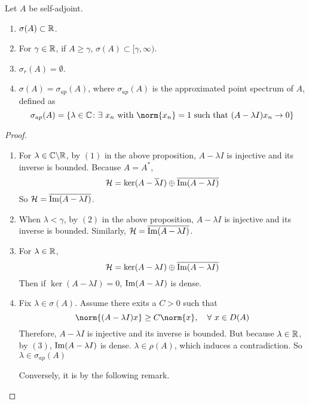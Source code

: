 \documentclass[a4paper,12pt]{article}
\begin{document}
\begin{thm}
    Let $A$ be self-adjoint.
    \begin{enumerate}[label=(\arabic{*})]
        \item $\sigma(A) \subset \mathbb{R}$.
        \item For $\gamma \in \mathbb{R}$, if $A \geq \gamma$, $\sigma(A) \subset [\gamma,\infty)$.
        \item $\sigma_r(A) = \emptyset$.
        \item $\sigma(A) = \sigma_{ap}(A)$, where $\sigma_{ap}(A)$ is the approximated point spectrum of $A$, defined as
        \begin{equation*}
            \sigma_{ap}(A) = \bb{\lambda \in \C \colon \exists~x_n \text{ with } \norm{x_n} = 1 \text{ such that } (A - \lambda I)x_n \sto 0}
        \end{equation*}
    \end{enumerate}
\end{thm}
\begin{proof}
    \begin{enumerate}[label=(\arabic{*})]
        \item For $\lambda \in \mathbb{C} \backslash \mathbb{R}$, by $(1)$ in the above proposition, $A - \lambda I$ is injective and its inverse is bounded. Because $A = A^*$,
        \begin{equation*}
            \mathcal{H} = \ker (A - \overline{\lambda}I) \oplus \overline{\operatorname{Im} (A - \lambda I)}
        \end{equation*}
        So $ \mathcal{H} = \overline{\operatorname{Im} (A - \lambda I)}$. 

        \item When $\lambda < \gamma$, by $(2)$ in the above proposition, $A - \lambda I$ is injective and its inverse is bounded. Similarly,  $ \mathcal{H} = \overline{\operatorname{Im} (A - \lambda I)}$.

        \item For $\lambda \in \mathbb{R}$,
        \begin{equation*}
            \mathcal{H} = \ker (A - \lambda I) \oplus \overline{\operatorname{Im} (A - \lambda I)}
        \end{equation*}
        Then if $\ker (A - \lambda I) = 0$, $\operatorname{Im} (A - \lambda I)$ is dense.

        \item Fix $\lambda \in \sigma(A)$. Assume there exits a $C > 0$ such that
        \begin{equation*}
            \norm{(A-\lambda I)x} \geq C \norm{x},\quad \forall~x \in D(A)
        \end{equation*}
        Therefore, $A - \lambda I$ is injective and its inverse is bounded. But because $\lambda \in \mathbb{R}$, by $(3)$, $\operatorname{Im} (A - \lambda I)$ is dense. $\lambda \in \rho(A)$, which induces a contradiction. So $\lambda \in \sigma_{ap}(A)$

        Conversely, it is by the following remark.
    \end{enumerate}
\end{proof}
\end{document}
